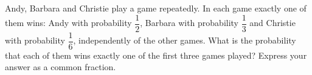 Andy, Barbara and Christie play a game repeatedly. In each game exactly one of them wins: Andy with probability $\dfrac{1}{2}$, Barbara with probability $\dfrac{1}{3}$ and Christie with probability $\dfrac{1}{6}$, independently of the other games. What is the probability that each of them wins exactly one of the first three games played? Express your answer as a common fraction.
